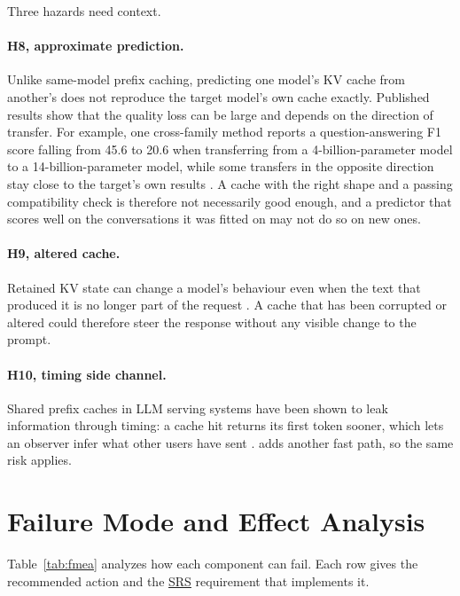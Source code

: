 \documentclass{article}
\newcommand{\srs}{\href{../SRS-Volere/SRS.pdf}{SRS}}
\begin{document}
Three hazards need context.

\paragraph{H8, approximate prediction.} Unlike same-model prefix caching,
predicting one model's KV cache from another's does not reproduce the
target model's own cache exactly. Published results show that the quality
loss can be large and depends on the direction of transfer. For example,
one cross-family method reports a question-answering F1 score falling from
45.6 to 20.6 when transferring from a 4-billion-parameter model to a
14-billion-parameter model, while some transfers in the opposite direction
stay close to the target's own results \cite{Yun2026HeteroFold}. A cache
with the right shape and a passing compatibility check is therefore not
necessarily good enough, and a predictor that scores well on the
conversations it was fitted on may not do so on new ones.

\paragraph{H9, altered cache.} Retained KV state can change a model's
behaviour even when the text that produced it is no longer part of the
request \cite{Zhang2026Aborted}. A cache that has been corrupted or altered
could therefore steer the response without any visible change to the
prompt.

\paragraph{H10, timing side channel.} Shared prefix caches in LLM serving
systems have been shown to leak information through timing: a cache hit
returns its first token sooner, which lets an observer infer what other
users have sent \cite{Song2024EarlyBird}. \progname{} adds another fast
path, so the same risk applies.

\section{Failure Mode and Effect Analysis}
\label{sec:fmea}

Table~\ref{tab:fmea} analyzes how each component can fail. Each row gives
the recommended action and the \srs{} requirement that implements it.
\end{document}
